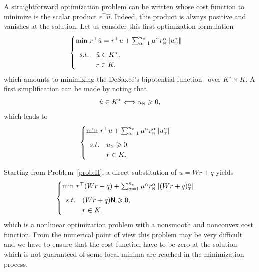{ A straightforward optimization problem can be written whose cost function to minimize is the scalar product $r^\top\hat u$. Indeed, this product is always  positive and vanishes at the solution. Let us consider this first optimization formulation
\begin{equation}
  \label{eq:opt-1}
  \begin{cases}
    \min\,  r^\top \hat u = r^\top u + \sum _{\alpha=1}^{n_c} \mu^\alpha r_\n^\alpha \|u_\t^\alpha\| \\[2mm]
    \begin{array}{ll}
    s.t. &\hat u \in K^\star, \\
    &r \in K,
  \end{array}
  \end{cases}
\end{equation}
which amounts to minimizing the DeSaxc\'e's bipotential function~\cite{DeSaxce92} over $K^\star\times K$. A first simplification can be made by noting that
\begin{equation}
  \label{eq:equiv-cone}
  \hat u \in K^\star \Longleftrightarrow u_{\n} \geq 0, 
\end{equation}
which leads to
\begin{equation}
  \label{eq:opt-2}
  \begin{cases}
    \min\, r^\top u + \sum _{\alpha=1}^{n_c} \mu^\alpha r_\n^\alpha \|u_\t^\alpha\| \\[2mm]
     \begin{array}{ll}
    s.t. &u_\n \geq 0\\
    &r \in K.
  \end{array}
  \end{cases}
\end{equation}


Starting from Problem~\ref{prob:II}, a direct substitution of $u = Wr +q$ yields
\begin{equation}
  \label{eq:opt-3}
  \begin{cases}
    \min\, r^\top (Wr+q) + \sum _{\alpha=1}^{n_c} \mu^\alpha r_\n^\alpha \|(Wr+q)_\t^\alpha\| \\[2mm]
    \begin{array}{ll}
      s.t. &(W r + q){\sf N} \geq 0, \\
      &r \in K.
    \end{array}
  \end{cases}
\end{equation}
which is a nonlinear optimization problem with a nonsmooth and nonconvex cost function.  From the numerical point of view this problem may be very difficult and we have to ensure that the cost function have to be zero at the solution which is not guaranteed of some local minima are reached in the minimization process.

}
